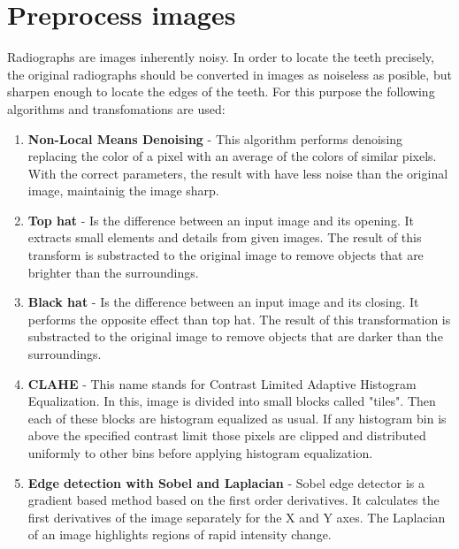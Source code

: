 \section{Preprocess images}

Radiographs are images inherently noisy. In order to locate
the teeth precisely, the original radiographs should be
converted in images as noiseless as posible, but sharpen
enough to locate the edges of the teeth. For this purpose
the following algorithms and transfomations are used:

\begin{enumerate}
  \item \textbf{Non-Local Means Denoising} - This algorithm
  performs denoising replacing the color of a pixel with
  an average of the colors of similar pixels. With the correct
  parameters, the result with have less noise than the original
  image, maintainig the image sharp.
\item \textbf{Top hat} - Is the difference between an input
  image and its opening. It extracts small elements and details
  from given images. The result of this transform is substracted
  to the original image to remove objects that are brighter than
  the surroundings.
\item \textbf{Black hat} - Is the difference between an input
  image and its closing. It performs the opposite effect than
  top hat. The result of this transformation is substracted to
  the original image to remove objects that are darker than the
  surroundings.
\item \textbf{CLAHE} - This name stands for Contrast Limited
  Adaptive Histogram Equalization. In this, image is divided
  into small blocks called "tiles". Then each of these blocks
  are histogram equalized as usual. If any histogram bin is
  above the specified contrast limit those pixels are clipped
  and distributed uniformly to other bins before applying
  histogram equalization.
\item \textbf{Edge detection with Sobel and Laplacian} - Sobel
  edge detector is a gradient based method based on the first
  order derivatives. It calculates the first derivatives of
  the image separately for the X and Y axes. The Laplacian of
  an image highlights regions of rapid intensity change.
\end{enumerate}

